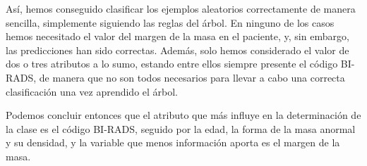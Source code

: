 \documentclass[a4paper,11pt]{article}
\begin{document}
Así, hemos conseguido clasificar los ejemplos aleatorios correctamente de manera sencilla, simplemente siguiendo las reglas del árbol. En ninguno de los casos hemos necesitado el valor del margen de la masa en el paciente, y, sin embargo, las predicciones han sido correctas. Además, solo hemos considerado el valor de dos o tres atributos a lo sumo, estando entre ellos siempre presente el código BI-RADS, de manera que no son todos necesarios para llevar a cabo una correcta clasificación una vez aprendido el árbol. 

Podemos concluir entonces que el atributo que más influye en la determinación de la clase es el código BI-RADS, seguido por la edad, la forma de la masa anormal y su densidad, y la variable que menos información aporta es el margen de la masa.

\newpage
\end{document}

